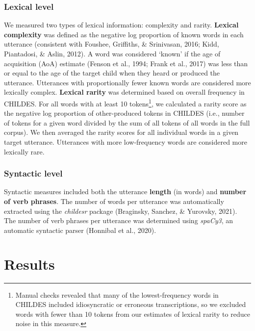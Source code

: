 \documentclass[10pt, letterpaper]{article}
\begin{document}
\hypertarget{lexical-level}{%
\subsubsection{Lexical level}\label{lexical-level}}

We measured two types of lexical information: complexity and rarity.
\textbf{Lexical complexity} was defined as the negative log proportion
of known words in each utterance (consistent with Foushee, Griffiths, \&
Srinivasan, 2016; Kidd, Piantadosi, \& Aslin, 2012). A word was
considered `known' if the age of acquisition (AoA) estimate (Fenson et
al., 1994; Frank et al., 2017) was less than or equal to the age of the
target child when they heard or produced the utterance. Utterances with
proportionally fewer known words are considered more lexically complex.
\textbf{Lexical rarity} was determined based on overall frequency in
CHILDES. For all words with at least 10 tokens\footnote{Manual checks
  revealed that many of the lowest-frequency words in CHILDES included
  idiosyncratic or erroneous transcriptions, so we excluded words with
  fewer than 10 tokens from our estimates of lexical rarity to reduce
  noise in this measure.}, we calculated a rarity score as the negative
log proportion of other-produced tokens in CHILDES (i.e., number of
tokens for a given word divided by the sum of all tokens of all words in
the full corpus). We then averaged the rarity scores for all individual
words in a given target utterance. Utterances with more low-frequency
words are considered more lexically rare.

\hypertarget{syntactic-level}{%
\subsubsection{Syntactic level}\label{syntactic-level}}

Syntactic measures included both the utterance \textbf{length} (in
words) and \textbf{number of verb phrases}. The number of words per
utterance was automatically extracted using the \emph{childesr} package
(Braginsky, Sanchez, \& Yurovsky, 2021). The number of verb phrases per
utterance was determined using \emph{spaCy3}, an automatic syntactic
parser (Honnibal et al., 2020).

\hypertarget{results-1}{%
\section{Results}\label{results-1}}
\end{document}

